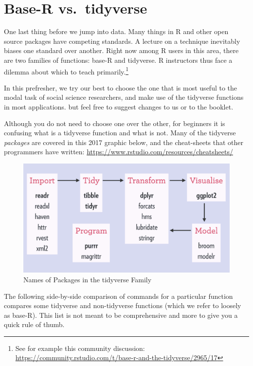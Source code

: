 \documentclass[]{book}
\let\rmarkdownfootnote\footnote%
\def\footnote{\protect\rmarkdownfootnote}
\theoremstyle{definition}
\theoremstyle{definition}
\theoremstyle{definition}
\theoremstyle{remark}
\begin{document}
\section{Base-R vs.~tidyverse}\label{base-r-vs.tidyverse}

One last thing before we jump into data. Many things in R and other open
source packages have competing standards. A lecture on a technique
inevitably biases one standard over another. Right now among R users in
this area, there are two families of functions: base-R and tidyverse. R
instructors thus face a dilemma about which to teach
primarily.\footnote{See for example this community discussion:
  \url{https://community.rstudio.com/t/base-r-and-the-tidyverse/2965/17}}

In this prefresher, we try our best to choose the one that is most
useful to the modal task of social science researchers, and make use of
the tidyverse functions in most applications. but feel free to suggest
changes to us or to the booklet.

Although you do not need to choose one over the other, for beginners it
is confusing what is a tidyverse function and what is not. Many of the
tidyverse \emph{packages} are covered in this 2017 graphic below, and
the cheat-sheets that other programmers have written:
\url{https://www.rstudio.com/resources/cheatsheets/}

\begin{figure}
\centering
\includegraphics{images/tidyverse-packages.png}
\caption{Names of Packages in the tidyverse Family}
\end{figure}

The following side-by-side comparison of commands for a particular
function compares some tidyverse and non-tidyverse functions (which we
refer to loosely as base-R). This list is not meant to be comprehensive
and more to give you a quick rule of thumb.
\end{document}
